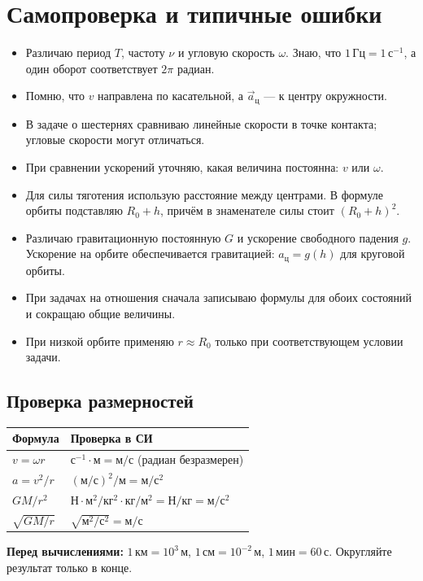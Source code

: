 \documentclass[a4paper,12pt]{article}
\newcommand{\key}[1]{\textcolor{darkaccent}{\textbf{#1}}}
\newcommand{\unit}[1]{\,\text{#1}}
\begin{document}
\section{Самопроверка и типичные ошибки}
\begin{itemize}[itemsep=8pt]
\item[$\square$] Различаю период $T$, частоту $\nu$ и угловую скорость $\omega$. Знаю, что $1\unit{Гц}=1\unit{с}^{-1}$, а один оборот соответствует $2\pi$ радиан.
\item[$\square$] Помню, что $v$ направлена по касательной, а $\vec a_{\text{ц}}$ --- к центру окружности.
\item[$\square$] В задаче о шестернях сравниваю линейные скорости в точке контакта; угловые скорости могут отличаться.
\item[$\square$] При сравнении ускорений уточняю, какая величина постоянна: $v$ или $\omega$.
\item[$\square$] Для силы тяготения использую расстояние между центрами. В формуле орбиты подставляю $R_0+h$, причём в знаменателе силы стоит $(R_0+h)^2$.
\item[$\square$] Различаю гравитационную постоянную $G$ и ускорение свободного падения $g$. Ускорение на орбите обеспечивается гравитацией: $a_{\text{ц}}=g(h)$ для круговой орбиты.
\item[$\square$] При задачах на отношения сначала записываю формулы для обоих состояний и сокращаю общие величины.
\item[$\square$] При низкой орбите применяю $r\approx R_0$ только при соответствующем условии задачи.
\end{itemize}
\subsection*{Проверка размерностей}
\begin{center}
\renewcommand{\arraystretch}{1.4}
\begin{tabularx}{\linewidth}{@{}l X@{}}
\toprule Формула & Проверка в СИ\\\midrule
$v=\omega r$ & $\text{с}^{-1}\cdot\text{м}=\text{м}/\text{с}$ (радиан безразмерен)\\
$a=v^2/r$ & $(\text{м}/\text{с})^2/\text{м}=\text{м}/\text{с}^2$\\
$GM/r^2$ & $\text{Н}\cdot\text{м}^2/\text{кг}^2\cdot\text{кг}/\text{м}^2=\text{Н}/\text{кг}=\text{м}/\text{с}^2$\\
$\sqrt{GM/r}$ & $\sqrt{\text{м}^2/\text{с}^2}=\text{м}/\text{с}$\\\bottomrule
\end{tabularx}
\end{center}
\key{Перед вычислениями:} $1\unit{км}=10^3\unit{м}$, $1\unit{см}=10^{-2}\unit{м}$, $1\unit{мин}=60\unit{с}$. Округляйте результат только в конце.
\clearpage
\end{document}
